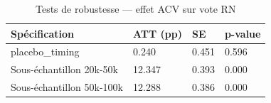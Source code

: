 \begin{table}
\caption{Tests de robustesse — effet ACV sur vote RN}
\label{tab:robustness}
\begin{tabular}{llll}
\toprule
Spécification & ATT (pp) & SE & p-value \\
\midrule
placebo\_timing & 0.240 & 0.451 & 0.596 \\
Sous-échantillon 20k-50k & 12.347 & 0.393 & 0.000 \\
Sous-échantillon 50k-100k & 12.288 & 0.386 & 0.000 \\
\bottomrule
\end{tabular}
\end{table}
